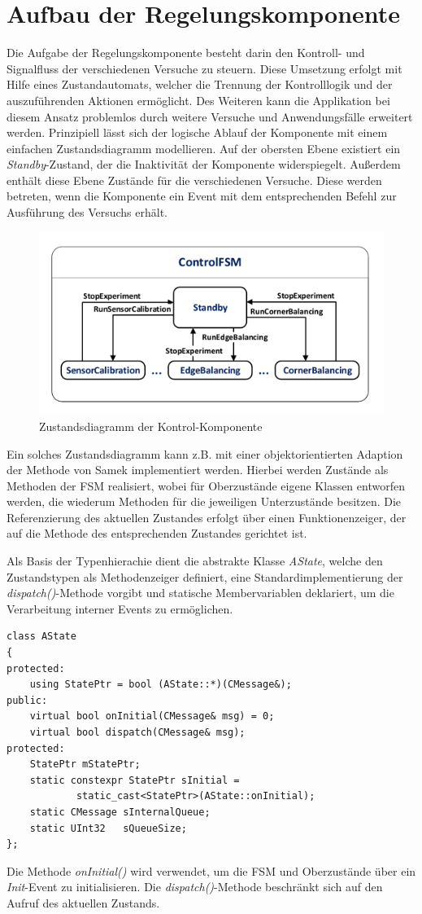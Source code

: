 \section{Aufbau der Regelungskomponente}\label{section_controlcomp}
Die Aufgabe der Regelungskomponente besteht darin den Kontroll- und Signalfluss der verschiedenen Versuche zu steuern. Diese Umsetzung erfolgt mit Hilfe eines Zustandautomats, welcher die Trennung der Kontrolllogik und der auszuführenden Aktionen ermöglicht. Des Weiteren kann die Applikation bei diesem Ansatz problemlos durch weitere Versuche und Anwendungsfälle erweitert werden. 
Prinzipiell lässt sich der logische Ablauf der Komponente mit einem einfachen Zustandsdiagramm modellieren. Auf der obersten Ebene existiert ein \textit{Standby}-Zustand, der die Inaktivität der Komponente widerspiegelt. Außerdem enthält diese Ebene Zustände für die verschiedenen Versuche. Diese werden betreten, wenn die Komponente ein Event mit dem entsprechenden Befehl zur Ausführung des Versuchs erhält.
\begin{figure}[h!]
\centering
\includegraphics[width=0.7\linewidth]{img/SW_2_ControlComp_SC.pdf}
\caption{Zustandsdiagramm der Kontrol-Komponente}
\end{figure}
Ein solches Zustandsdiagramm kann z.B. mit einer objektorientierten Adaption der Methode von Samek \cite[S. 246 ff.]{Wietzke1} implementiert werden. Hierbei werden Zustände als Methoden der FSM realisiert, wobei für Oberzustände eigene Klassen entworfen werden, die wiederum Methoden für die jeweiligen Unterzustände besitzen. Die Referenzierung des aktuellen Zustandes erfolgt über einen Funktionenzeiger, der auf die Methode des entsprechenden Zustandes gerichtet ist. 

Als Basis der Typenhierachie dient die abstrakte Klasse \textit{AState}, welche den Zustandstypen als Methodenzeiger definiert, eine Standardimplementierung der \textit{dispatch()}-Methode vorgibt und statische Membervariablen deklariert, um die Verarbeitung interner Events zu ermöglichen.
\begin{lstlisting}[caption={Abstrakte Basisklasse für die Zustände},captionpos=b]
class AState
{
protected:
	using StatePtr = bool (AState::*)(CMessage&);
public:
	virtual bool onInitial(CMessage& msg) = 0;
	virtual bool dispatch(CMessage& msg);
protected:
	StatePtr mStatePtr;
	static constexpr StatePtr sInitial = 
			static_cast<StatePtr>(AState::onInitial);
	static CMessage sInternalQueue;
	static UInt32   sQueueSize;
};
\end{lstlisting}
Die Methode \textit{onInitial()} wird verwendet, um die FSM und Oberzustände über ein \textit{Init}-Event zu initialisieren. Die \textit{dispatch()}-Methode beschränkt sich auf den Aufruf des aktuellen Zustands.

